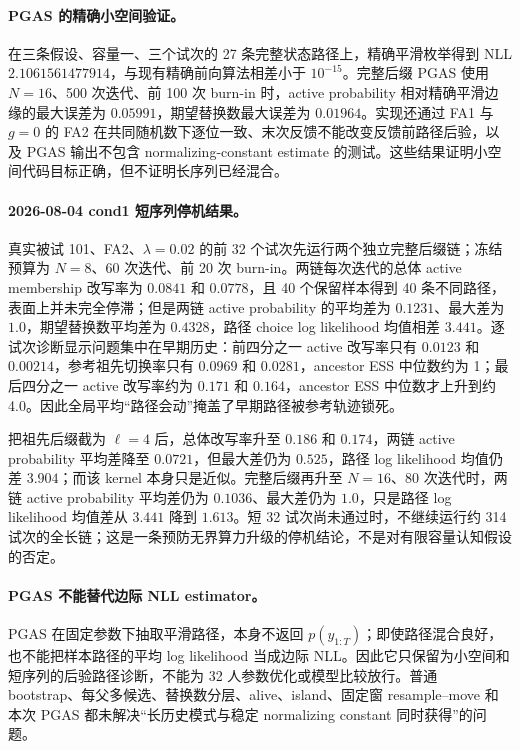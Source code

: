 \paragraph{PGAS 的精确小空间验证。}
在三条假设、容量一、三个试次的 27 条完整状态路径上，精确平滑枚举得到 NLL $2.1061561477914$，与现有精确前向算法相差小于 $10^{-15}$。完整后缀 PGAS 使用 $N=16$、500 次迭代、前 100 次 burn-in 时，active probability 相对精确平滑边缘的最大误差为 $0.05991$，期望替换数最大误差为 $0.01964$。实现还通过 FA1 与 $g=0$ 的 FA2 在共同随机数下逐位一致、末次反馈不能改变反馈前路径后验，以及 PGAS 输出不包含 normalizing-constant estimate 的测试。这些结果证明小空间代码目标正确，但不证明长序列已经混合。

\paragraph{2026-08-04 cond1 短序列停机结果。}
真实被试 101、FA2、$\lambda=0.02$ 的前 32 个试次先运行两个独立完整后缀链；冻结预算为 $N=8$、60 次迭代、前 20 次 burn-in。两链每次迭代的总体 active membership 改写率为 $0.0841$ 和 $0.0778$，且 40 个保留样本得到 40 条不同路径，表面上并未完全停滞；但是两链 active probability 的平均差为 $0.1231$、最大差为 $1.0$，期望替换数平均差为 $0.4328$，路径 choice log likelihood 均值相差 $3.441$。逐试次诊断显示问题集中在早期历史：前四分之一 active 改写率只有 $0.0123$ 和 $0.00214$，参考祖先切换率只有 $0.0969$ 和 $0.0281$，ancestor ESS 中位数约为 1；最后四分之一 active 改写率约为 $0.171$ 和 $0.164$，ancestor ESS 中位数才上升到约 4.0。因此全局平均“路径会动”掩盖了早期路径被参考轨迹锁死。

把祖先后缀截为 $\ell=4$ 后，总体改写率升至 $0.186$ 和 $0.174$，两链 active probability 平均差降至 $0.0721$，但最大差仍为 $0.525$，路径 log likelihood 均值仍差 $3.904$；而该 kernel 本身只是近似。完整后缀再升至 $N=16$、80 次迭代时，两链 active probability 平均差仍为 $0.1036$、最大差仍为 $1.0$，只是路径 log likelihood 均值差从 $3.441$ 降到 $1.613$。短 32 试次尚未通过时，不继续运行约 314 试次的全长链；这是一条预防无界算力升级的停机结论，不是对有限容量认知假设的否定。

\paragraph{PGAS 不能替代边际 NLL estimator。}
PGAS 在固定参数下抽取平滑路径，本身不返回 $p(y_{1:T})$；即使路径混合良好，也不能把样本路径的平均 log likelihood 当成边际 NLL。因此它只保留为小空间和短序列的后验路径诊断，不能为 32 人参数优化或模型比较放行。普通 bootstrap、每父多候选、替换数分层、alive、island、固定窗 resample--move 和本次 PGAS 都未解决“长历史模式与稳定 normalizing constant 同时获得”的问题。

